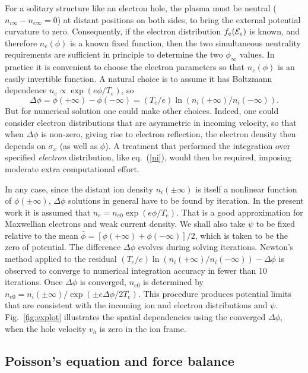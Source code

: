 \documentclass[pre]{revtex4-2}
\def\energy{{\cal E}}
\begin{document}
For a solitary structure like an electron hole, the plasma must be
neutral ($n_{i\infty}-n_{e\infty}=0$) at distant positions
on both sides, to bring the external potential curvature to
zero. Consequently, if the electron distribution $f_e(\energy_e)$ is
known, and therefore $n_e(\phi)$ is a known fixed function, then the
two simultaneous neutrality requirements are sufficient in principle
to determine the two $\phi_\infty$ values. In practice it is
convenient to choose the electron parameters so that $n_e(\phi)$ is an
easily invertible function. A natural choice is to assume it has
Boltzmann dependence $n_e\propto \exp(e\phi/T_e)$, so
\begin{equation}\label{fedist}
\Delta \phi=\phi(+\infty)-\phi(-\infty)=
(T_e/e)\ln(n_i(+\infty)/n_i(-\infty)).  
\end{equation}
But for numerical solution one could make other choices. Indeed, one
could consider electron distributions that are asymmetric in incoming
velocity, so that when $\Delta\phi$ is non-zero, giving rise to
electron reflection, the electron density then depends on $\sigma_x$ (as
well as $\phi$). A treatment that performed the integration over
specified \emph{electron} distribution, like eq.\ (\ref{ni}), would
then be required, imposing moderate extra computational effort.

In any case, since the distant ion density $n_i(\pm\infty)$ is itself
a nonlinear function of $\phi(\pm\infty)$, $\Delta\phi$ solutions in
general have to be found by iteration. In the present work it is
assumed that $n_e=n_{e0}\exp(e\phi/T_e)$. That is a good approximation
for Maxwellian electrons and weak current density. We shall also take
$\psi$ to be fixed relative to the mean
$\bar\phi=[\phi(+\infty)+\phi(-\infty)]/2$, which is taken
to be the zero of potential. The difference $\Delta\phi$ evolves
during solving iterations. Newton's method applied to the residual
$(T_e/e)\ln(n_i(+\infty)/n_i(-\infty))-\Delta\phi$ is observed to
converge to numerical integration accuracy in fewer than
10 iterations. Once $\Delta\phi$ is converged, $n_{e0}$ is determined
by $n_{e0}=n_i(\pm\infty)/\exp(\pm e\Delta\phi/2T_e)$.  This procedure
produces potential limits that are consistent with the incoming ion
and electron distributions and $\psi$. Fig.\ \ref{fig:explot}
illustrates the spatial dependencies using the converged
$\Delta\phi$, when the hole velocity $v_h$ is zero in the ion frame.


\subsection{Poisson's equation and force balance}
\end{document}
